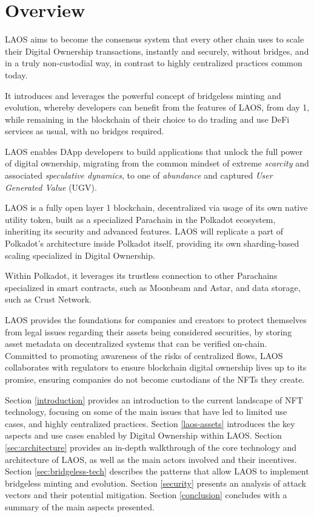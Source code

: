 \section{Overview}\label{overview}

LAOS aims to become the consensus system that every other chain uses to scale their Digital Ownership transactions,
instantly and securely, without bridges, and in a truly non-custodial way, in contrast to highly centralized practices common today.

It introduces and leverages the powerful concept of bridgeless minting and evolution, 
whereby developers can benefit from the features of LAOS, from day 1, while remaining in the blockchain of their choice
to do trading and use DeFi services as usual, with no bridges required.

LAOS enables DApp developers to build applications that unlock the full power of 
digital ownership, migrating from the common mindset of extreme {\it scarcity} and associated {\it speculative dynamics}, 
to one of {\it abundance} and captured {\it User Generated Value} (UGV).

LAOS is a fully open layer 1 blockchain, decentralized via usage of its own native utility token,
built as a specialized Parachain in the Polkadot
ecosystem, inheriting its security and advanced features. LAOS will replicate a part of Polkadot's architecture
inside Polkadot itself, providing its own sharding-based scaling specialized in Digital Ownership. 

Within Polkadot, it leverages its trustless connection
to other Parachains specialized in smart contracts, such as Moonbeam and Astar,
and data storage, such as Crust Network.

LAOS provides the foundations for companies and creators to
protect themselves from legal issues regarding their assets being considered securities,
by storing asset metadata on decentralized systems that can be verified on-chain.
Committed to promoting awareness of the risks of centralized flows, LAOS collaborates with
regulators to ensure blockchain digital ownership lives up to its promise,
ensuring companies do not become custodians of the NFTs they create.

Section \ref{introduction} provides an introduction to the current landscape of NFT technology,
focusing on some of the main issues that have led to limited use cases, and highly centralized
practices. 
Section \ref{laos-assets} introduces the key aspects and
use cases enabled by Digital Ownership within LAOS.
%
Section \ref{sec:architecture} provides an in-depth walkthrough of the core 
technology and architecture of LAOS, as well as the main actors involved and their incentives.
Section \ref{sec:bridgeless-tech} describes the patterns that allow LAOS to implement
bridgeless minting and evolution. 
%
Section \ref{security} presents an analysis of attack vectors and their
potential mitigation. 
%
Section \ref{conclusion} concludes with a summary
of the main aspects presented.